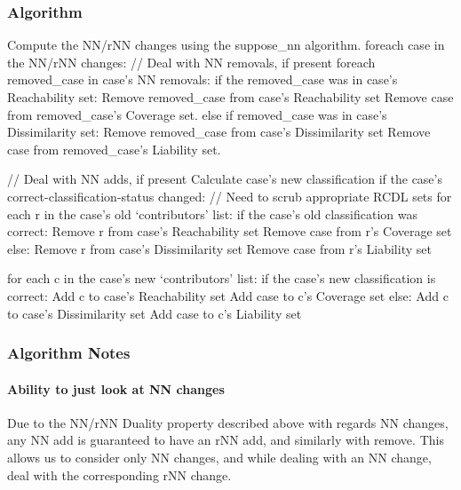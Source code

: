\documentclass[a4paper,11pt]{report}
\begin{document}
\begin{samepage}

\subsubsection{Algorithm}
\vspace{10pt}

\begin{code}
Compute the NN/rNN changes using the suppose_nn algorithm.
foreach case in the NN/rNN changes:
  // Deal with NN removals, if present
  foreach removed_case in case's NN removals:
    if the removed_case was in case's Reachability set:
      Remove removed_case from case's Reachability set
      Remove case from removed_case's Coverage set.
    else if removed_case was in case's Dissimilarity set:
      Remove removed_case from case's Dissimilarity set
      Remove case from removed_case's Liability set.

  // Deal with NN adds, if present  
  Calculate case's new classification
  if the case's correct-classification-status changed:
    // Need to scrub appropriate RCDL sets
    for each r in the case's old `contributors' list:
      if the case's old classification was correct:
        Remove r from case's Reachability set
        Remove case from r's Coverage set
      else:
        Remove r from case's Dissimilarity set
        Remove case from r's Liability set
        
  for each c in the case's new `contributors' list:
    if the case's new classification is correct:
      Add c to case's Reachability set
      Add case to c's Coverage set
    else:
      Add c to case's Dissimilarity set
      Add case to c's Liability set
\end{code}
\end{samepage}

\subsubsection{Algorithm Notes}
\paragraph{Ability to just look at NN changes}
Due to the NN/rNN Duality property described above with regards NN changes, any NN add is guaranteed to have an rNN add, and similarly with remove. This allows us to consider only NN changes, and while dealing with an NN change, deal with the corresponding rNN change.
\end{document}
